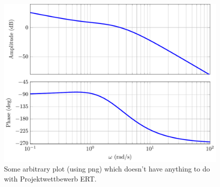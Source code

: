 \documentclass[pdf]{ifacconf}
\begin{document}
\begin{figure}[h] %
\begin{center}
\includegraphics[width=.8\columnwidth]{bode} %
\caption{Some arbitrary plot (using png) which doesn't have anything to do with Projektwettbewerb ERT.}
\label{fig1}
\end{center}
\end{figure}





%
%

\end{document}

